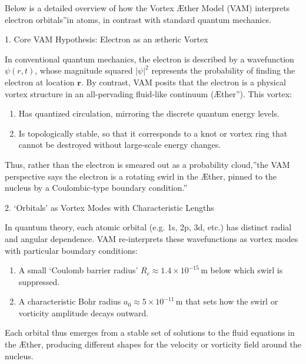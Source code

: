 Below is a detailed overview of how the Vortex Æther Model (VAM) interprets electron \grqq orbitals\textquotedblright in atoms, in contrast with standard quantum mechanics.





1. Core VAM Hypothesis: Electron as an ætheric Vortex

In conventional quantum mechanics, the electron is described by a wavefunction \(\psi(r,t)\), whose magnitude squared \(|\psi|^2\) represents the probability of finding the electron at location \(\mathbf{r}\). By contrast, VAM posits that the electron is a physical vortex structure in an all-pervading fluid‐like continuum (\grqq Æther\textquotedblright). This vortex:

\begin{enumerate}
\item Has quantized circulation, mirroring the discrete quantum energy levels.
\item Is topologically stable, so that it corresponds to a knot or vortex ring that cannot be destroyed without large‐scale energy changes.
\end{enumerate}
Thus, rather than \grqq the electron is smeared out as a probability cloud,\textquotedblright the VAM perspective says \grqq the electron is a rotating swirl in the Æther, pinned to the nucleus by a Coulombic‐type boundary condition.\textquotedblright


2. ‘Orbitals' as Vortex Modes with Characteristic Lengths

In quantum theory, each atomic orbital (e.g. 1s, 2p, 3d, etc.) has distinct radial and angular dependence. VAM re‐interprets these wavefunctions as vortex modes with particular boundary conditions:

\begin{enumerate}
\item A small ‘Coulomb barrier radius' \(R_c \approx 1.4 \times 10^{-15}\,\mathrm{m}\) below which swirl is suppressed.
\item A characteristic Bohr radius \(a_0 \approx 5 \times 10^{-11}\,\mathrm{m}\) that sets how the swirl or vorticity amplitude decays outward.
\end{enumerate}
Each orbital thus emerges from a stable set of solutions to the fluid equations in the Æther, producing different shapes for the velocity or vorticity field around the nucleus.





